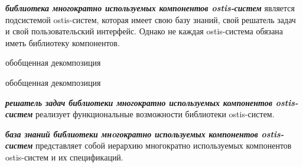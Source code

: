 \textbf{\textit{библиотека многократно используемых компонентов ostis-систем}} является подсистемой ostis-систем, которая имеет свою базу знаний, свой решатель задач и свой пользовательский интерфейс. Однако не каждая ostis-система обязана иметь библиотеку компонентов.

\begin{SCn}
	\begin{scnrelfromset}{обобщенная декомпозиция}
		\begin{scnindent}
			\begin{scnrelfromset}{обобщенная декомпозиция}
				\begin{scnindent}
				\end{scnindent}
			\end{scnrelfromset}
		\end{scnindent}
	\end{scnrelfromset}
\end{SCn}

\textbf{\textit{решатель задач библиотеки многократно используемых компонентов ostis-систем}} реализует функциональные возможности библиотеки ostis-систем.

\textbf{\textit{база знаний библиотеки мнoгократно используемых компонентов ostis-систем}} представляет собой иерархию многократно используемых компонентов ostis-систем и их спецификаций.

